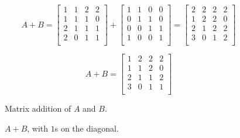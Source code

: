 \documentclass[../gatm.tex]{subfiles}
\begin{document}
\begin{figure}[h]
	\begin{center}
		\begin{minipage}[b]{0.55\textwidth}
			\centering
			$$A+B=\left[\begin{array}{cccc}
			1 & 1 & 2 & 2 \\
			1 & 1 & 1 & 0 \\
			2 & 1 & 1 & 1 \\
			2 & 0 & 1 & 1 \\
			\end{array}\right] + \left[\begin{array}{cccc}
			1 & 1 & 0 & 0 \\
			0 & 1 & 1 & 0 \\
			0 & 0 & 1 & 1 \\
			1 & 0 & 0 & 1 \\
			\end{array}\right] = \left[\begin{array}{cccc}
			2 & 2 & 2 & 2 \\
			1 & 2 & 2 & 0 \\
			2 & 1 & 2 & 2 \\
			3 & 0 & 1 & 2 \\
			\end{array}\right]$$
			\vspace*{0.5\baselineskip}
		\end{minipage}
		\hfill
		\begin{minipage}[b]{0.35\textwidth}
			$$A+B=\left[\begin{array}{cccc}
			1 & 2 & 2 & 2 \\
			1 & 1 & 2 & 0 \\
			2 & 1 & 1 & 2 \\
			3 & 0 & 1 & 1 \\
			\end{array}\right]$$
			\vspace*{0.5\baselineskip}
		\end{minipage}
	\end{center}
	\vspace*{-2\baselineskip}
	\begin{center}
		\begin{minipage}[t]{0.55\textwidth}
			\caption{Matrix addition of $A$ and $B$.}
			\label{fig:mtrx_add}
		\end{minipage}
		\hfill
		\begin{minipage}[t]{0.35\textwidth}
			\caption{$A+B$, with $1$s on the diagonal.}
			\label{fig:mtrx_replace}
		\end{minipage}
	\end{center}
\end{figure}
\end{document}
